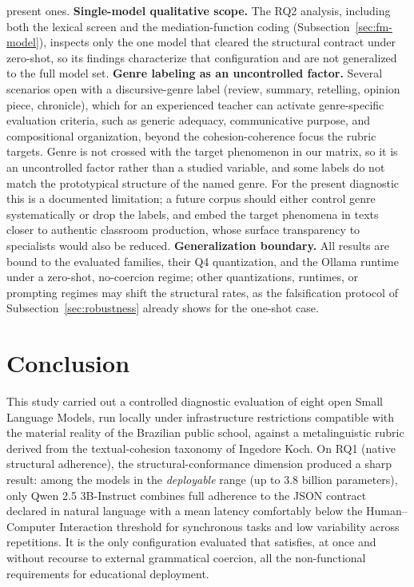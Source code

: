 \documentclass{sbc2023}%
\begin{document}
present ones. \textbf{Single-model qualitative scope.} The RQ2 analysis, including both the lexical screen and the mediation-function coding (Subsection~\ref{sec:fm-model}), inspects only the one model that cleared the structural contract under zero-shot, so its findings characterize that configuration and are not generalized to the full model set. \textbf{Genre labeling as an uncontrolled factor.} Several scenarios open with a discursive-genre label (review, summary, retelling, opinion piece, chronicle), which for an experienced teacher can activate genre-specific evaluation criteria, such as generic adequacy, communicative purpose, and compositional organization, beyond the cohesion-coherence focus the rubric targets. Genre is not crossed with the target phenomenon in our matrix, so it is an uncontrolled factor rather than a studied variable, and some labels do not match the prototypical structure of the named genre. For the present diagnostic this is a documented limitation; a future corpus should either control genre systematically or drop the labels, and embed the target phenomena in texts closer to authentic classroom production, whose surface transparency to specialists would also be reduced. \textbf{Generalization boundary.} All results are bound to the evaluated families, their Q4 quantization, and the Ollama runtime under a zero-shot, no-coercion regime; other quantizations, runtimes, or prompting regimes may shift the structural rates, as the falsification protocol of Subsection~\ref{sec:robustness} already shows for the one-shot case.

\section{Conclusion}
\label{sec:conclusion}

This study carried out a controlled diagnostic evaluation of eight open Small Language Models, run locally under infrastructure restrictions compatible with the material reality of the Brazilian public school, against a metalinguistic rubric derived from the textual-cohesion taxonomy of Ingedore Koch. On RQ1 (native structural adherence), the structural-conformance dimension produced a sharp result: among the models in the \textit{deployable} range (up to 3.8 billion parameters), only Qwen 2.5 3B-Instruct combines full adherence to the JSON contract declared in natural language with a mean latency comfortably below the Human--Computer Interaction threshold for synchronous tasks and low variability across repetitions. It is the only configuration evaluated that satisfies, at once and without recourse to external grammatical coercion, all the non-functional requirements for educational deployment.
\end{document}
